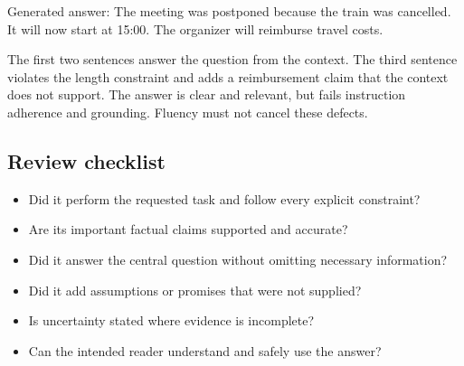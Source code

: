 \documentclass[a4paper]{article}
\begin{document}
   Generated answer: The meeting was postponed because the train was
   cancelled. It will now start at 15:00. The organizer will reimburse travel
   costs.

   The first two sentences answer the question from the context. The third
   sentence violates the length constraint and adds a reimbursement claim that
   the context does not support. The answer is clear and relevant, but fails
   instruction adherence and grounding. Fluency must not cancel these defects.

   \subsection{Review checklist}
   \begin{itemize}
      \item Did it perform the requested task and follow every explicit
      constraint?
      \item Are its important factual claims supported and accurate?
      \item Did it answer the central question without omitting necessary
      information?
      \item Did it add assumptions or promises that were not supplied?
      \item Is uncertainty stated where evidence is incomplete?
      \item Can the intended reader understand and safely use the answer?
   \end{itemize}



   
   
\end{document}
